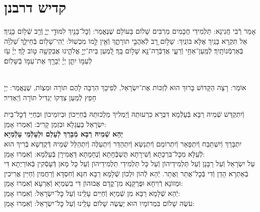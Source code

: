 \documentclass[twoside, openany, parskip=half, 11pt]{book}
\begin{document}
\tachanunim

\vfill


\sepline


\chapter[קדיש דרבנן]{ קדיש דרבנן }
\label{kaddish derabonan}


אָמַר רְֿבִי חֲנִינָא: תַּלְמִידֵי חֲכָמִים מַרְבִּים שָׁלוֹם בָּעוֹלָם שֶׁנֶּאֱמַר: וְֿכׇל־בָּנַ֖יִךְ לִמּוּדֵ֣י יְיָ֑ וְֿרַ֖ב שְֿׁל֥וֹם בָּנָֽיִךְ׃ אַל תִּקְרָא בָּנַֽיִךְ אֶלָּא בּוֹנַֽיִךְ: שָׁל֣וֹם רָ֭ב לְֿאֹֽהֲבֵ֣י תוֹרָתֶ֑ךָ וְֿאֵ֖ין לָ֣מוֹ מִכְשֽׁוֹל: יְֿהִֽי־שָׁל֥וֹם בְּֿחֵילֵ֑ךְ שַׁ֝לְוָ֗ה בְּֿאַרְמְֿנוֹתָֽיִךְ׃ לְֿמַֽעַן־אַחַ֥י וְֿרֵעָ֑י אֲדַבְּֿרָה־נָּ֖א שָׁל֣וֹם בָּֽךְ׃ לְֿ֭מַעַן בֵּית־יְיָ֣ אֱלֹהֵ֑ינוּ אֲבַקְשָׁ֖ה ט֣וֹב לָֽךְ׃ יְיָ֗ עֹ֖ז לְֿעַמּ֣וֹ יִתֵּ֑ן יְיָ֓ יְֿבָרֵ֖ךְ אֶת־עַמּ֣וֹ בַֿשָּׁלֽוֹם׃

\\
אוֹמֵר: רָצָה הַקָּדוֹשׁ בָּרוּךְ הוּא לְֿזַכּוֹת אֶת־יִשְׂרָאֵל, לְֿפִיכָךְ הִרְבָּה לָהֶם תּוֹרָה וּמִצְוֹת, שֶׁנֶּאֱמַר:
יְיָ חָפֵץ לְֿמַעַן צִדְקוֹ יַגְדִּיל תּוֹרָה וְֿיַאְדִּיר׃


\begin{kaddish}

וְֿיִתְקַדַּשׁ שְֿׁמֵיהּ רַבָּא בְּֿעָלְֿמָא דִּבְרָא כִרְעוּתֵהּ
וְֿיַמְלִיךְ מַלְכוּתֵהּ בְּֿחַיֵּיכוֹן וּבְיוֹמֵיכוֹן וּבְחַיֵּי דְֿכׇל־בֵּית יִשְׂרָאֵל בַּעֲגָלָא וּבִזְמַן קָרִיב: וְֿאִמְרוּ אָמֵן: \\
\textbf{יְהֵא שְֿׁמֵיהּ רַבָּא מְֿבָרַךְ לְֿעָלַם וּלְעָלְֿמֵי עָלְֿמַיָּא}\\
יִתְבָּרַךְ וְֿיִשְׁתַּבַּח וְֿיִתְפָּאַר וְֿיִתְרוֹמַם וְֿיִתְנַשֵּׂא
וְֿיִתְהַדַּר וְֿיִתְעַלֶּה וְֿיִתְהַלַּל שְֿׁמֵיהּ דְּֿקֻדְשָׁא בְּֿרִיךְ הוּא
לְֿעֵֽלָּא מִכׇּל־בִּרְכָתָא וְֿשִׁירָתָא תֻּשְׁבְּֿחָתָא וְֿנֶחָמָתָא
דַּאֲמִירָן בְּֿעָלְֿמָא: וְֿאִמְרוּ אָמֵן:\\
עַל יִשְׂרָאֵל וְֿעַל רַבָּנָן וְֿעַל תַּלְמִידֵיהוֹן וְֿעַל כָּל תַּלְמִידֵי תַלְמִידֵיהוֹן וְֿעַל כָּל מָאן דְּֿעָסְֿקִין בְּֿאוֹרַיְתָא דִּי בְֿאַתְרָא הָדֵן וְֿדִי בְּֿכׇל־אֲתַר וַאֲתַר. יְֿהֵא לְֿהוֹן וּלְכוֹן שְֿׁלָמָא רַבָּא חִנָּא וְֿחִסְדָּא וְֿרַחֲמִין וְֿחַיִּין אֲרִיכִין וּמְזוֹנָא רְֿוִיחָא וּפֻרְקָנָא מִן־קֳדָם אֲבוּהוׂן דִּי בִשְׁמַיָּא וְֿאַרְעָא וְֿאִמְרוּ אָמֵן:\\
יְֿהֵא שְֿׁלָמָא רַבָּא מִן שְֿׁמַיָּא וְֿחַיִּים עָלֵֽינוּ וְֿעַל כׇּל־יִשְׂרָאֵל: וְֿאִמְרוּ אָמֵן:\\
עֹשֶׂה שָׁלוֹם בִּמְרוֹמָיו הוּא יַעֲשֶׂה שָׁלוֹם עָלֵֽינוּ וְֿעַל כׇּל־יִשְׂרָאֵל: וְֿאִמְרוּ אָמֵן:
\end{kaddish}
\end{document}
